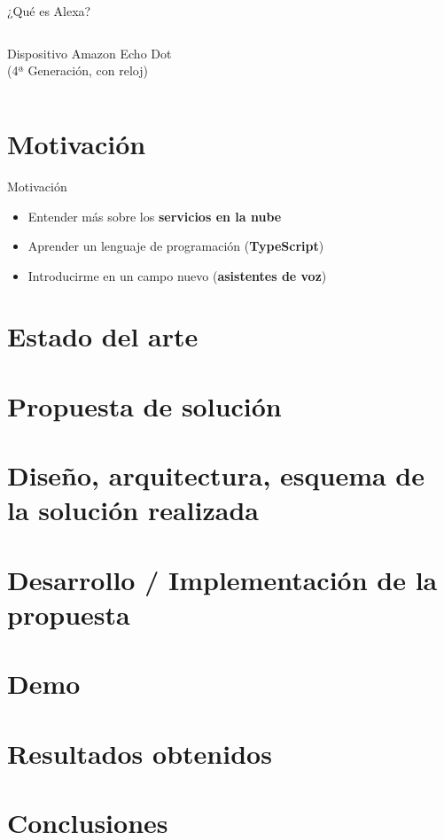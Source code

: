 \documentclass{beamer}
\begin{document}
\begin{frame}{¿Qué es Alexa?}
\begin{columns}[c]
\begin{column}{.49\textwidth}
        \centering \vspace{0.5em}
        
        \footnotesize
        Dispositivo Amazon Echo Dot\\
        (4ª Generación, con reloj)
      \end{column}
    \end{columns}
  \end{frame}

  \section{Motivación}

  \newcommand{\includecenteredgraphics}[2]{\hspace{.1em}\raisebox{-.35\height}{\texttt{[image: \#2]}}}
 
  \begin{frame}{Motivación}
    \begin{itemize}
      \setlength\itemsep{1.5em}
      \item Entender más sobre los \textbf{servicios en la nube}
      \includecenteredgraphics{.35}{aws-lambda-logo.png}
      \item Aprender un lenguaje de programación (\textbf{TypeScript})
      \includecenteredgraphics{.02}{typescript-logo.png}
      \item Introducirme en un campo nuevo (\textbf{asistentes de voz})
      \includecenteredgraphics{1}{amazon-alexa.png}
    \end{itemize}
  \end{frame}

  \section{Estado del arte}
  
  \section{Propuesta de solución}
  
  \section{Diseño, arquitectura, esquema de la solución realizada}
  
  \section{Desarrollo / Implementación de la propuesta}
  
  \section{Demo}
  
  \section{Resultados obtenidos}
  
  \section{Conclusiones} %
\end{document}
